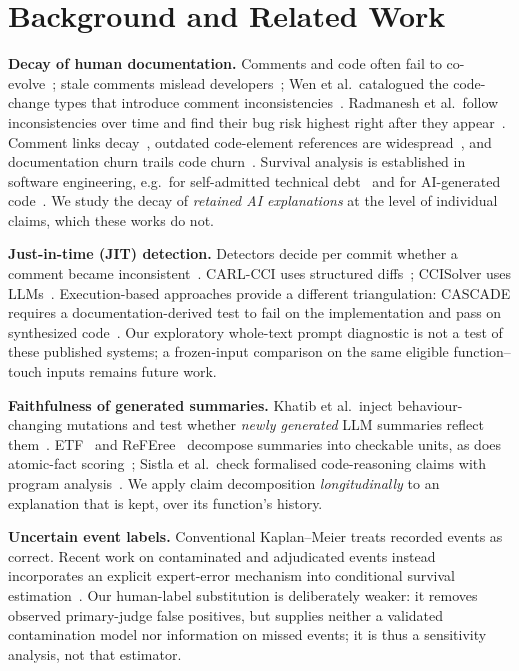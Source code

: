 \section{Background and Related Work}\label{sec:related}

\textbf{Decay of human documentation.} Comments and code often fail to co-evolve~\cite{fluri2007coevolve}; stale comments mislead developers~\cite{tan2007icomment}; Wen et al.\ catalogued the code-change types that introduce comment inconsistencies~\cite{wen2019large}. Radmanesh et al.\ follow inconsistencies over time and find their bug risk highest right after they appear~\cite{radmanesh2024impact}. Comment links decay~\cite{hata2019links}, outdated code-element references are widespread~\cite{tan2022outdated}, and documentation churn trails code churn~\cite{hovhannisyan2024churn}. Survival analysis is established in software engineering, e.g.\ for self-admitted technical debt~\cite{muse2022satd} and for AI-generated code~\cite{rahman2026survive}. We study the decay of \emph{retained AI explanations} at the level of individual claims, which these works do not.

\textbf{Just-in-time (JIT) detection.} Detectors decide per commit whether a comment became inconsistent~\cite{panthaplackel2021deep,liu2023jit}. CARL-CCI uses structured diffs~\cite{nguyen2026larger}; CCISolver uses LLMs~\cite{zhong2025ccisolver}. Execution-based approaches provide a different triangulation: CASCADE requires a documentation-derived test to fail on the implementation and pass on synthesized code~\cite{kiecker2026cascade}. Our exploratory whole-text prompt diagnostic is not a test of these published systems; a frozen-input comparison on the same eligible function--touch inputs remains future work.

\textbf{Faithfulness of generated summaries.} Khatib et al.\ inject behaviour-changing mutations and test whether \emph{newly generated} LLM summaries reflect them~\cite{khatib2026mutation}. ETF~\cite{maharaj2024etf} and ReFEree~\cite{bae2026referee} decompose summaries into checkable units, as does atomic-fact scoring~\cite{min2023factscore}; Sistla et al.\ check formalised code-reasoning claims with program analysis~\cite{sistla2025verified}. We apply claim decomposition \emph{longitudinally} to an explanation that is kept, over its function's history.

\textbf{Uncertain event labels.} Conventional Kaplan--Meier treats recorded events as correct. Recent work on contaminated and adjudicated events instead incorporates an explicit expert-error mechanism into conditional survival estimation~\cite{bladt2026contaminated}. Our human-label substitution is deliberately weaker: it removes observed primary-judge false positives, but supplies neither a validated contamination model nor information on missed events; it is thus a sensitivity analysis, not that estimator.

